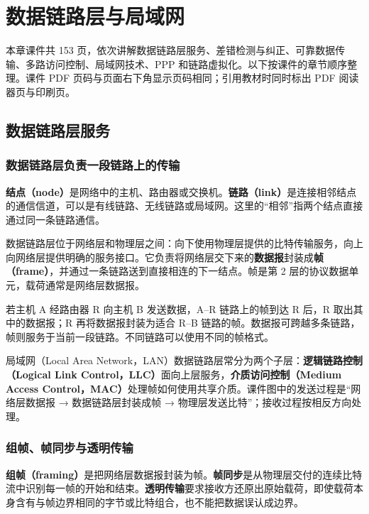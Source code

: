 \chapter{数据链路层与局域网}

\noindent 本章课件共 153 页，依次讲解数据链路层服务、差错检测与纠正、可靠数据传输、多路访问控制、局域网技术、PPP 和链路虚拟化。以下按课件的章节顺序整理。课件 PDF 页码与页面右下角显示页码相同；引用教材时同时标出 PDF 阅读器页与印刷页。

\section{数据链路层服务}

\subsection{数据链路层负责一段链路上的传输}
\textbf{结点（node）}是网络中的主机、路由器或交换机。\textbf{链路（link）}是连接相邻结点的通信信道，可以是有线链路、无线链路或局域网。这里的“相邻”指两个结点直接通过同一条链路通信。

数据链路层位于网络层和物理层之间：向下使用物理层提供的比特传输服务，向上向网络层提供明确的服务接口。它负责将网络层交下来的\textbf{数据报}封装成\textbf{帧（frame）}，并通过一条链路送到直接相连的下一结点。帧是第 2 层的协议数据单元，载荷通常是网络层数据报。

若主机 A 经路由器 R 向主机 B 发送数据，A--R 链路上的帧到达 R 后，R 取出其中的数据报；R 再将数据报封装为适合 R--B 链路的帧。数据报可跨越多条链路，帧则服务于当前一段链路。不同链路可以使用不同的帧格式。

局域网（Local Area Network，LAN）数据链路层常分为两个子层：\textbf{逻辑链路控制（Logical Link Control，LLC）}面向上层服务，\textbf{介质访问控制（Medium Access Control，MAC）}处理帧如何使用共享介质。课件图中的发送过程是“网络层数据报 → 数据链路层封装成帧 → 物理层发送比特”；接收过程按相反方向处理。


\subsection{组帧、帧同步与透明传输}
\textbf{组帧（framing）}是把网络层数据报封装为帧。\textbf{帧同步}是从物理层交付的连续比特流中识别每一帧的开始和结束。\textbf{透明传输}要求接收方还原出原始载荷，即使载荷本身含有与帧边界相同的字节或比特组合，也不能把数据误认成边界。

